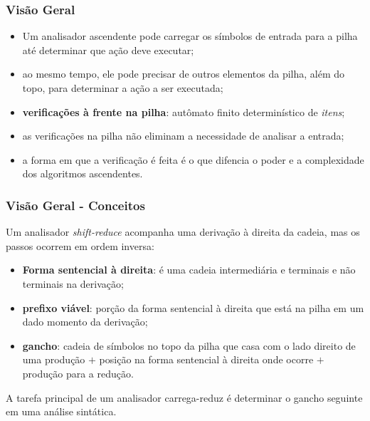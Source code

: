 \documentclass[table]{beamer}
\begin{document}
\begin{frame}
   \frametitle{Visão Geral}
   \begin{itemize}
      \item Um analisador ascendente pode carregar os símbolos de entrada para a pilha até determinar que ação deve executar;
      \item ao mesmo tempo, ele pode precisar de outros elementos da pilha, além do topo, para determinar a ação a ser executada;
      \item \textbf{verificações à frente na pilha}: autômato finito determinístico de \textit{itens};
      \item as verificações na pilha não eliminam a necessidade de analisar a entrada;
      \item a forma em que a verificação é feita é o que difencia o poder e a complexidade dos algoritmos ascendentes.
   \end{itemize}
\end{frame}

\begin{frame}
   \frametitle{Visão Geral - Conceitos}
   Um analisador \textit{shift-reduce} acompanha uma derivação à direita da cadeia, mas os passos ocorrem em ordem inversa:
   \begin{itemize}
      \item \textbf{Forma sentencial à direita}: é uma cadeia intermediária e terminais e não terminais na derivação;
      \item \textbf{prefixo viável}: porção da forma sentencial à direita que está na pilha em um dado momento da derivação;
      \item \textbf{gancho}: cadeia de símbolos no topo da pilha que casa com o lado direito de uma produção $+$ posição na forma sentencial à direita onde ocorre $+$ produção para a redução.
   \end{itemize}
   A tarefa principal de um analisador carrega-reduz é determinar o gancho seguinte em uma análise sintática.
\end{frame}
\end{document}
